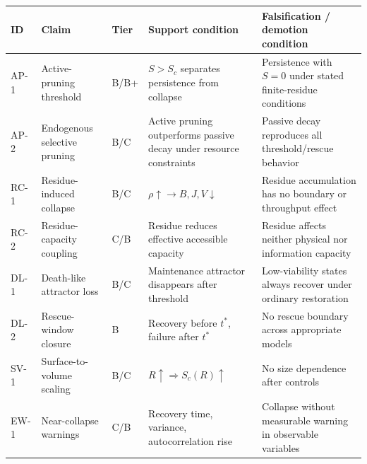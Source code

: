 \documentclass[10pt,a4paper,twocolumn,aps,prl]{revtex4-2}
\theoremstyle{claimstyle}
\theoremstyle{definition}
\begin{document}
\begin{table}[t]
\centering
\small
\renewcommand{\arraystretch}{1.3}
\begin{tabular}{lllll}
\toprule
\textbf{ID} & \textbf{Claim} & \textbf{Tier} & \textbf{Support condition} & \textbf{Falsification / demotion condition} \\
\midrule
AP-1 & \parbox[t]{2.8cm}{\raggedright Active-pruning threshold} & B/B+ & \parbox[t]{4.8cm}{\raggedright $S>S_c$ separates persistence from collapse} & \parbox[t]{5.5cm}{\raggedright Persistence with $S=0$ under stated finite-residue conditions} \\
AP-2 & \parbox[t]{2.8cm}{\raggedright Endogenous selective pruning} & B/C & \parbox[t]{4.8cm}{\raggedright Active pruning outperforms passive decay under resource constraints} & \parbox[t]{5.5cm}{\raggedright Passive decay reproduces all threshold/rescue behavior} \\
RC-1 & \parbox[t]{2.8cm}{\raggedright Residue-induced collapse} & B/C & \parbox[t]{4.8cm}{\raggedright $\rho\uparrow\to B,J,V\downarrow$} & \parbox[t]{5.5cm}{\raggedright Residue accumulation has no boundary or throughput effect} \\
RC-2 & \parbox[t]{2.8cm}{\raggedright Residue-capacity coupling} & C/B & \parbox[t]{4.8cm}{\raggedright Residue reduces effective accessible capacity} & \parbox[t]{5.5cm}{\raggedright Residue affects neither physical nor information capacity} \\
DL-1 & \parbox[t]{2.8cm}{\raggedright Death-like attractor loss} & B/C & \parbox[t]{4.8cm}{\raggedright Maintenance attractor disappears after threshold} & \parbox[t]{5.5cm}{\raggedright Low-viability states always recover under ordinary restoration} \\
DL-2 & \parbox[t]{2.8cm}{\raggedright Rescue-window closure} & B & \parbox[t]{4.8cm}{\raggedright Recovery before $t^*$, failure after $t^*$} & \parbox[t]{5.5cm}{\raggedright No rescue boundary across appropriate models} \\
SV-1 & \parbox[t]{2.8cm}{\raggedright Surface-to-volume scaling} & B/C & \parbox[t]{4.8cm}{\raggedright $R\uparrow\Rightarrow S_c(R)\uparrow$} & \parbox[t]{5.5cm}{\raggedright No size dependence after controls} \\
EW-1 & \parbox[t]{2.8cm}{\raggedright Near-collapse warnings} & C/B & \parbox[t]{4.8cm}{\raggedright Recovery time, variance, autocorrelation rise} & \parbox[t]{5.5cm}{\raggedright Collapse without measurable warning in observable variables} \\

\end{tabular}
\end{table}
\end{document}
